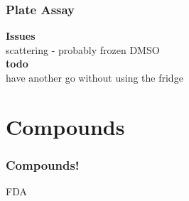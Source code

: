 \documentclass[10pt]{beamer}
\begin{document}
\begin{frame}
	\frametitle{\textbf{Plate Assay }}
	\textbf{Issues} \\
	scattering - probably frozen DMSO \\
	\textbf{todo}\\
	have another go without using the fridge
\end{frame}


\section{Compounds}
\begin{frame}
	\frametitle{\textbf{Compounds!}}
	FDA
\end{frame}
\end{document}
